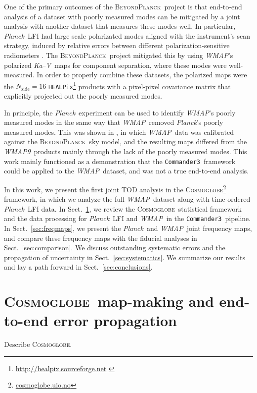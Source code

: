 \documentclass[twocolumn]{../../common/aa}
\def\WMAP{\emph{WMAP}}
\def\WMAPnine{\emph{WMAP9}}
\def\Planck{\emph{Planck}}
\def\healpix{\texttt{HEALPix}}
\def\commanderthree{\texttt{Commander3}}
\newcommand{\BP}{\textsc{BeyondPlanck}}
\newcommand{\bp}{\textsc{BeyondPlanck}}
\newcommand{\cosmoglobe}{\textsc{Cosmoglobe}}
\newcommand{\Ka}[0]{\textit{Ka}}
\newcommand{\V}[0]{\textit V}
\begin{document}
One of the primary outcomes of the \BP\ project is that end-to-end analysis of a dataset with poorly measured modes can be mitigated by a joint analysis with another dataset that measures these modes well. In particular, \Planck\ LFI had large scale polarizated modes aligned with the instrument's scan strategy, induced by relative errors between different polarization-sensitive radiometers \citep{bp07}. The \bp\ project mitigated this by using \WMAP's polarized \Ka--\V\ maps for component separation, where these modes were well-measured. In order to properly combine these datasets, the polarized maps were the $N_\mathrm{side}=16$ \healpix\footnote{\url{http://healpix.sourceforge.net} \citep{gorski2005}} products with a pixel-pixel covariance matrix that explicitly projected out the poorly measured modes.

In principle, the \Planck\ experiment can be used to identify \WMAP's poorly measured modes in the same way that \WMAP\ removed \Planck's poorly measured modes. This was shown in \citet{bp17}, in which \WMAP\ data was calibrated against the \bp\ sky model, and the resulting maps differed from the \WMAPnine\ products mainly through the lack of the poorly measured modes. This work mainly functioned as a demonstration that the \commanderthree\ framework could be applied to the \WMAP\ dataset, and was not a true end-to-end analysis.

In this work, we present the first joint TOD analysis in the \cosmoglobe\footnote{\url{cosmoglobe.uio.no}} framework, in which we analyze the full \WMAP\ dataset along with time-ordered \Planck\ LFI data. In Sect.~\ref{sec:methods}, we review the \cosmoglobe\ statistical framework and the data processing for \Planck\ LFI and \WMAP\ in the \commanderthree\ pipeline. In Sect.~\ref{sec:freqmaps}, we present the \Planck\ and \WMAP\ joint frequency maps, and compare these frequency maps with the fiducial analyses in Sect.~\ref{sec:comparison}. We discuss outstanding systematic errors and the propagation of uncertainty in Sect.~\ref{sec:systematics}. We summarize our results and lay a path forward in Sect.~\ref{sec:conclusions}.



\section{\cosmoglobe\ map-making and end-to-end error propagation}
\label{sec:methods}


Describe \cosmoglobe.
\end{document}
